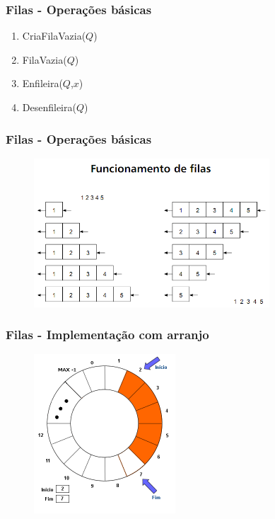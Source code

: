 \documentclass[aspectratio=169]{beamer}
\begin{document}

\begin{frame}
\frametitle{Filas - Operações básicas}
\begin{enumerate}
 \item CriaFilaVazia($Q$) 
 \item FilaVazia($Q$)
 \item Enfileira($Q$,$x$)
 \item Desenfileira($Q$) 
\end{enumerate}
\end{frame}


\begin{frame}
\frametitle{Filas - Operações básicas}
\begin{figure}[!h]
  \centering
  \includegraphics[width=250pt]{imgs/operacoes_filas.png}
  \label{fig_operacoes_filas}
\end{figure}
\end{frame}


\begin{frame}
\frametitle{Filas - Implementação com arranjo}
\begin{figure}[!h]
  \centering
  \includegraphics[width=150pt]{imgs/fila_implementacao.png}
  \label{fig_fila_implementacao}
\end{figure}
\end{frame}
\end{document}
